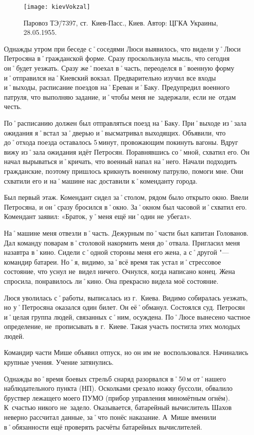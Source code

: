 \begin{wrapfigure}{O}{.4\textwidth}
\centering
\texttt{[image: kievVokzal]}
\caption{Паровоз ТЭ\=/7397, ст.~Киев-Пасс., Киев. Автор: ЦГКА Украины, 28.05.1955.}
\label{fig:kievVokzal}
\end{wrapfigure}

Однажды утром при беседе с˚соседями Люси выявилось, что видели у˚Люси Петросяна в˚гражданской форме. Сразу проскользнула мысль, что сегодня он˚будет уезжать. Сразу же˚поехал в˚часть, переоделся в˚военную форму и˚отправился на˚Киевский вокзал. Предварительно изучил все входы и˚выходы, расписание поездов на˚Ереван и˚Баку. Предупредил военного патруля, что выполняю задание, и˚чтобы меня не~задержали, если не~отдам честь. 

По˚расписанию должен был отправляться поезд на˚Баку. При˚выходе из˚зала ожидания я˚встал за˚дверью и˚высматривал выходящих. Объявили, что до˚отхода поезда оставалось 5\,минут, провожающим покинуть вагоны. Вдруг вижу из˚зала ожидания идёт Петросян. Поравнявшись со˚мной, схватил его. Он начал вырываться и˚кричать, что военный напал на˚него. Начали подходить гражданские, поэтому пришлось крикнуть военному патрулю, помоги мне. Они схватили его и на˚машине нас доставили к˚коменданту города. 

Был первый этаж. Комендант сидел за˚столом, рядом было открыто окно. Ввели Петросяна, и он˚сразу бросился в˚окно. За˚окном был часовой и˚схватил его. Комендант заявил: «Браток, у˚меня ещё ни˚один не~убегал». 

На˚машине меня отвезли в˚часть. Дежурным по˚части был капитан Голованов. Дал команду поварам в˚столовой накормить меня до˚отвала. Пригласил меня назавтра в˚кино. Сидели с˚одной стороны меня его жена, а с˚другой "--- командир батареи. Но˚я, видимо, за˚всё время так устал и˚стрессовое состояние, что уснул не~видел ничего. Очнулся, когда написано конец. Жена спросила, понравилось ли˚кино. Она прекрасно видела моё состояние. 

Люся уволилась с˚работы, выписалась из г.~Киева. Видимо собиралась уезжать, но у˚Петросяна оказался один билет. Он её˚обманул. Состоялся суд. Петросян и˚целая группа людей, связанных с˚ним, осуждена. По˚Люсе вынесено частное определение, не~прописывать в г.~Киеве. Такая участь постигла этих молодых людей.

Командир части Мише объявил отпуск, но он им не~воспользовался. Начинались крупные учения. Учение затянулись.

Однажды во˚время боевых стрельб снаряд разорвался в˚50\,м от˚нашего наблюдательного пункта (НП). Осколками срезало ножку буссоли, обвалило бруствер лежащего моего ПУМО (прибор управления миномётным огнём). К~счастью никого не~задело. Оказывается, батарейный вычислитель Шахов неверно рассчитал данные, за˚что понёс наказание. А~Мише вменили в˚обязанности ещё проверять расчёты батарейных вычислителей. 

